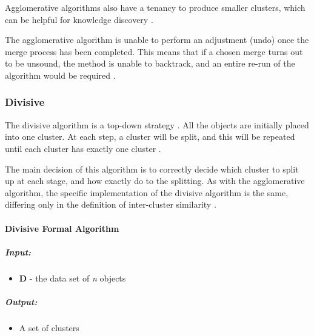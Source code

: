 Agglomerative algorithms also have a tenancy to produce smaller clusters, which
can be helpful for knowledge discovery \citep{iosHierarchical}.

The agglomerative algorithm is unable to perform an adjustment (undo) once the 
merge process has been completed. This means that if a chosen merge turns out 
to be unsound, the method is unable to backtrack, and an entire re-run of the 
algorithm would be required \citep{tan05}. 

\subsubsection{Divisive}
The divisive algorithm is a top-down strategy \citep{han06}. All the objects 
are initially placed into one cluster. At each step, a cluster will be split, 
and this will be repeated until each cluster has exactly one cluster 
\citep{tan05}. 

The main decision of this algorithm is to correctly decide which cluster to 
split up at each stage, and how exactly do to the splitting. As with the 
agglomerative algorithm, the specific implementation of the divisive algorithm 
is the same, differing only in the definition of inter-cluster similarity 
\citep{tan05}.

\paragraph*{Divisive Formal Algorithm}
\subparagraph*{Input:}
\begin{itemize}
  \item {\bf D} - the data set of {\em n} objects
\end{itemize}

\subparagraph*{Output:}
\begin{itemize}
  \item A set of clusters
\end{itemize}

